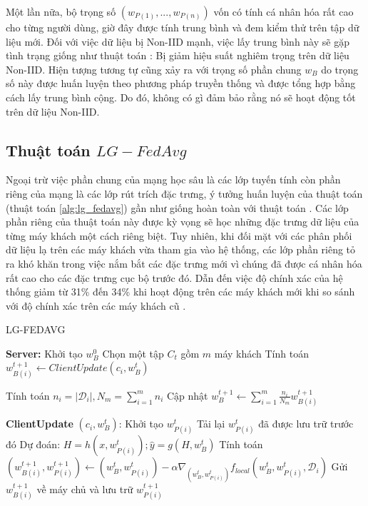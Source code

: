 Một lần nữa, bộ trọng số $(w_{P(1)},...,w_{P(n)})$ vốn có tính cá nhân hóa rất cao cho từng người dùng, giờ đây được tính trung bình và đem kiểm thử trên tập dữ liệu mới. Đối với việc dữ liệu bị Non-IID mạnh, việc lấy trung bình này sẽ gặp tình trạng giống như thuật toán : Bị giảm hiệu suất nghiêm trọng trên dữ liệu Non-IID. Hiện tượng tương tự cũng xảy ra với trọng số phần chung $w_B$ do trọng số này được huấn luyện theo phương pháp truyền thống và được tổng hợp bằng cách lấy trung bình cộng. Do đó, không có gì đảm bảo rằng nó sẽ hoạt động tốt trên dữ liệu Non-IID.

\subsection{Thuật toán $LG-FedAvg$}

Ngoại trừ việc phần chung của mạng học sâu là các lớp tuyến tính còn phần riêng của mạng là các lớp rút trích đặc trưng, ý tưởng huấn luyện của thuật toán  (thuật toán \ref{alg:lg_fedavg}) gần như giống hoàn toàn với thuật toán . Các lớp phần riêng của thuật toán này được kỳ vọng sẽ học những đặc trưng dữ liệu của từng máy khách một cách riêng biệt. Tuy nhiên, khi đối mặt với các phân phối dữ liệu lạ trên các máy khách vừa tham gia vào hệ thống, các lớp phần riêng tỏ ra khó khăn trong việc nắm bắt các đặc trưng mới vì chúng đã được cá nhân hóa rất cao cho các đặc trưng cục bộ trước đó. Dẫn đến việc độ chính xác của hệ thống giảm từ 31\% đến 34\% khi hoạt động trên các máy khách mới khi so sánh với độ chính xác trên các máy khách cũ \cite{liang2020think}.

\begin{algorithm}[H]
    \caption{LG-FEDAVG \cite{liang2020think}}\label{alg:lg_fedavg}
    \begin{algorithmic}[1]
        \State \textbf{Server:}
        \State Khởi tạo $w_B^0$
            \State Chọn một tập $C_t$ gồm $m$ máy khách
                \State Tính toán $w_{B(i)}^{t+1} \gets ClientUpdate(c_i,w_B^t)$
            \EndFor

            \State Tính toán $n_i = \left| \mathcal{D}_i \right|, N_m = \sum_{i=1}^m n_i$
            \State Cập nhật $w_B^{t+1} \gets \sum_{i=1}^m\frac{n_i}{N_m} w_{B(i)}^{t+1}$ %
        \EndFor

        \Statex

        \State \textbf{ClientUpdate} $(c_i, w_B^t)$: %
            \State Khởi tạo $w_{P(i)}^t$
        \Else
            \State Tải lại $w_{P(i)}^t$ đã được lưu trữ trước đó
        \EndIf
        \State Dự đoán: $H = h(x, w_{P(i)}^t); \hat{y} = g(H, w_B^t)$
        \State Tính toán $(w_{B(i)}^{t+1}, w_{P(i)}^{t+1}) \gets (w_{B}^t, w_{P(i)}^t) - \alpha\nabla_{(w_{B}^t, w_{P(i)}^t)} f_{local}(w_{B}^t, w_{P(i)}^t, \mathcal{D}_i)$
        \State Gửi $w_{B(i)}^{t+1}$ về máy chủ và lưu trữ $w_{P(i)}^{t+1}$
    \end{algorithmic}
\end{algorithm}

